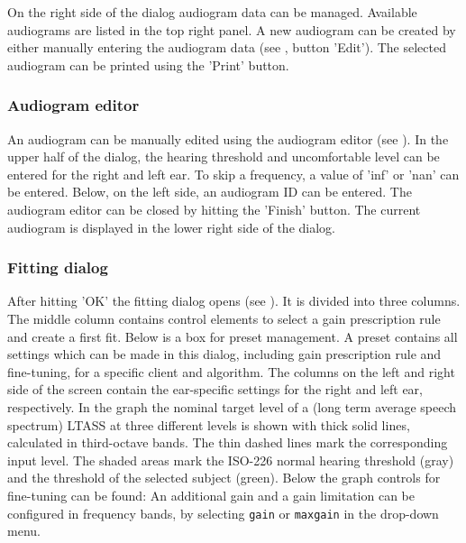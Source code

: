 \documentclass[11pt,a4paper,twoside]{article}
\newcommand{\+}{\discretionary{\mbox{\scriptsize$\hookleftarrow$}}{}{}}
\begin{document}

On the right side of the dialog audiogram data can be managed.
%
Available audiograms are listed in the top right panel.
%
A new audiogram can be created by either manually entering the
audiogram data (see , button
'Edit').
%
The selected audiogram can be printed using the 'Print' button.

\subsubsection*{Audiogram editor}

An audiogram can be manually edited using the audiogram editor (see
).
%
In the upper half of the dialog, the hearing threshold and
uncomfortable level can be entered for the right and left ear.
%
To skip a frequency, a value of 'inf' or 'nan' can be entered.
%
Below, on the left side, an audiogram ID can be entered.
%
The audiogram editor can be closed by hitting the 'Finish' button.
%
The current audiogram is displayed in the lower right side of the
dialog.


\subsubsection*{Fitting dialog}

After hitting 'OK' the fitting dialog opens (see ). It is divided into three columns. The middle column contains control
elements to select a gain prescription rule and create a first
fit. Below is a box for preset management. A preset contains all
settings which can be made in this dialog, including gain prescription
rule and fine-tuning, for a specific client and algorithm.  The
columns on the left and right side of the screen contain the
ear-specific settings for the right and left ear, respectively. In the
graph the nominal target level of a (long term average speech spectrum) LTASS at three different levels is
shown with thick solid lines, calculated in third-octave bands. The
thin dashed lines mark the corresponding input level. The shaded areas
mark the ISO-226 normal hearing threshold (gray) and the threshold of
the selected subject (green). Below the graph controls for fine-tuning
can be found: An additional gain and a gain limitation can be
configured in frequency bands, by selecting \verb!gain! or
\verb!maxgain! in the drop-down menu.
\end{document}
